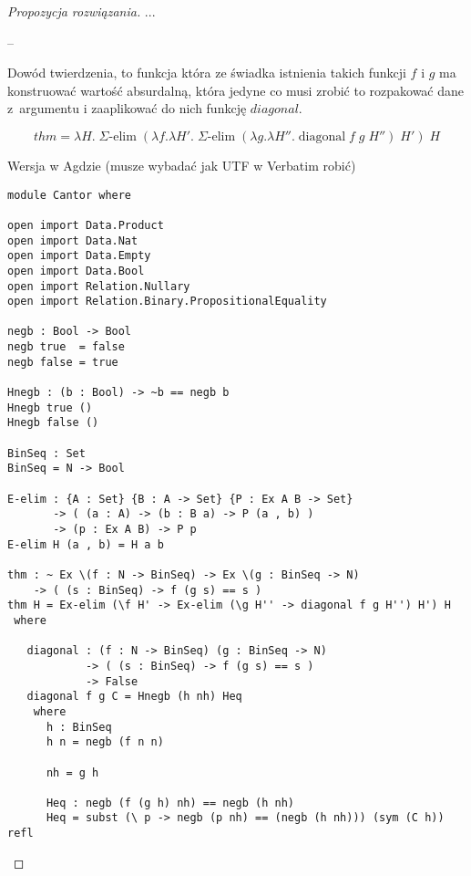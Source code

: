 \documentclass[10pt, a4paper]{article}
\begin{document}
\begin{proof}[Propozycja rozwiązania]
...

--

Dowód twierdzenia, to funkcja która ze świadka istnienia takich funkcji $f$ i $g$ ma konstruować wartość absurdalną, która
jedyne co musi zrobić to rozpakować dane z~argumentu i zaaplikować do nich funkcję $diagonal$. 

\[
thm = 
 \lambda H.\;
 \Sigma\mbox{-elim}\;
(\lambda f. \lambda H'.\; \Sigma\mbox{-elim}\; (\lambda g. \lambda H''.\;
\mbox{diagonal}\;f\;g\;H''
)\;
H')\;H
\]

Wersja w Agdzie (musze wybadać jak UTF w Verbatim robić)
\begin{verbatim}
module Cantor where

open import Data.Product 
open import Data.Nat
open import Data.Empty
open import Data.Bool
open import Relation.Nullary
open import Relation.Binary.PropositionalEquality

negb : Bool -> Bool
negb true  = false
negb false = true

Hnegb : (b : Bool) -> ~b == negb b
Hnegb true ()
Hnegb false ()

BinSeq : Set
BinSeq = N -> Bool

E-elim : {A : Set} {B : A -> Set} {P : Ex A B -> Set}
       -> ( (a : A) -> (b : B a) -> P (a , b) )
       -> (p : Ex A B) -> P p
E-elim H (a , b) = H a b

thm : ~ Ex \(f : N -> BinSeq) -> Ex \(g : BinSeq -> N)
    -> ( (s : BinSeq) -> f (g s) == s )
thm H = Ex-elim (\f H' -> Ex-elim (\g H'' -> diagonal f g H'') H') H
 where

   diagonal : (f : N -> BinSeq) (g : BinSeq -> N) 
            -> ( (s : BinSeq) -> f (g s) == s )
            -> False
   diagonal f g C = Hnegb (h nh) Heq
    where
      h : BinSeq
      h n = negb (f n n)

      nh = g h

      Heq : negb (f (g h) nh) == negb (h nh)
      Heq = subst (\ p -> negb (p nh) == (negb (h nh))) (sym (C h)) refl
\end{verbatim}


\end{proof}
\end{document}
